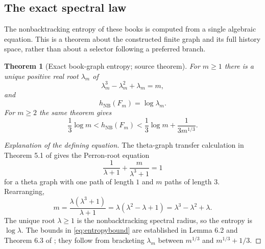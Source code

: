 \documentclass[11pt,a4paper]{article}
\newtheorem{theorem}{Theorem}[section]
\theoremstyle{definition}\newtheorem{definition}[theorem]{Definition}
\newcommand{\NB}{\mathrm{NB}}
\begin{document}
\subsection{The exact spectral law}
The nonbacktracking entropy of these books is computed from a single algebraic equation. This is a theorem about the constructed finite graph and its full history space, rather than about a selector following a preferred branch.

\begin{theorem}[Exact book-graph entropy; source theorem]\label{thm:bookentropy}
For $m\ge1$ there is a unique positive real root $\lambda_m$ of
\begin{equation}\label{eq:cubic}
\lambda_m^3-\lambda_m^2+\lambda_m=m,
\end{equation}
and
\begin{equation}\label{eq:entropy}
h_{\NB}(F_m)=\log\lambda_m.
\end{equation}
For $m\ge2$ the same theorem gives
\begin{equation}\label{eq:entropybound}
\frac13\log m<h_{\NB}(F_m)<\frac13\log m+\frac{1}{3m^{1/3}}.
\end{equation}
\end{theorem}
\begin{proof}[Explanation of the defining equation]
The theta-graph transfer calculation in Theorem 5.1 of \cite{entropy} gives the Perron-root equation
\[
\frac{1}{\lambda+1}+\frac{m}{\lambda^3+1}=1
\]
for a theta graph with one path of length $1$ and $m$ paths of length $3$. Rearranging,
\[
m=\frac{\lambda(\lambda^3+1)}{\lambda+1}
  =\lambda(\lambda^2-\lambda+1)
  =\lambda^3-\lambda^2+\lambda.
\]
The unique root $\lambda\ge1$ is the nonbacktracking spectral radius, so the entropy is $\log\lambda$. The bounds in \eqref{eq:entropybound} are established in Lemma 6.2 and Theorem 6.3 of \cite{entropy}; they follow from bracketing $\lambda_m$ between $m^{1/3}$ and $m^{1/3}+1/3$.
\end{proof}
\end{document}

